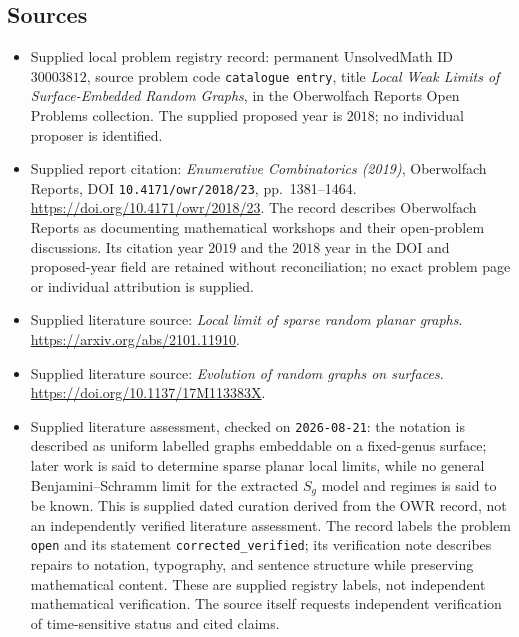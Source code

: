 \documentclass[11pt]{article}
\begin{document}
\subsection{Sources}
\begin{itemize}
\item Supplied local problem registry record: permanent UnsolvedMath ID \(30003812\), source problem code \texttt{catalogue entry}, title \emph{Local Weak Limits of Surface-Embedded Random Graphs}, in the Oberwolfach Reports Open Problems collection. The supplied proposed year is \(2018\); no individual proposer is identified.
\item Supplied report citation: \emph{Enumerative Combinatorics (2019)}, Oberwolfach Reports, DOI \texttt{10.4171/owr/2018/23}, pp.\ 1381--1464. \url{https://doi.org/10.4171/owr/2018/23}. The record describes Oberwolfach Reports as documenting mathematical workshops and their open-problem discussions. Its citation year \(2019\) and the \(2018\) year in the DOI and proposed-year field are retained without reconciliation; no exact problem page or individual attribution is supplied.
\item Supplied literature source: \emph{Local limit of sparse random planar graphs}. \url{https://arxiv.org/abs/2101.11910}.
\item Supplied literature source: \emph{Evolution of random graphs on surfaces}. \url{https://doi.org/10.1137/17M113383X}.
\item Supplied literature assessment, checked on \texttt{2026-08-21}: the notation is described as uniform labelled graphs embeddable on a fixed-genus surface; later work is said to determine sparse planar local limits, while no general Benjamini--Schramm limit for the extracted \(S_g\) model and regimes is said to be known. This is supplied dated curation derived from the OWR record, not an independently verified literature assessment. The record labels the problem \texttt{open} and its statement \texttt{corrected\_verified}; its verification note describes repairs to notation, typography, and sentence structure while preserving mathematical content. These are supplied registry labels, not independent mathematical verification. The source itself requests independent verification of time-sensitive status and cited claims.
\end{itemize}
\end{document}
